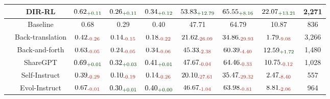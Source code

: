 \begin{table}[pos=tbp]
{\begin{tabular}{c|c|ccc|cc|cc}
& \textbf{DIR-RL} & \textbf{$\text{0.62}_{\textcolor{deepgreen}{\text{+0.11}}}$} & \textbf{$\text{0.26}_{\textcolor{deepgreen}{\text{+0.11}}}$} & \textbf{$\text{0.34}_{\textcolor{deepgreen}{\text{+0.12}}}$} & \textbf{$\text{53.83}_{\textcolor{deepgreen}{\text{+12.79}}}$} & \textbf{$\text{65.55}_{\textcolor{deepgreen}{\text{+8.16}}}$} & \textbf{$\text{22.07}_{\textcolor{deepgreen}{\text{+13.21}}}$} & 2,271 \\
\midrule
{} 
& Baseline & 0.68 & 0.29 & 0.40 & 47.71 & 64.79 & 10.87 & 836 \\
& Back-translation & $\text{0.42}_{\textcolor{deepred}{\text{-0.26}}}$ & $\text{0.14}_{\textcolor{deepred}{\text{-0.15}}}$ & $\text{0.18}_{\textcolor{deepred}{\text{-0.22}}}$ & $\text{21.62}_{\textcolor{deepred}{\text{-26.09}}}$ & $\text{34.86}_{\textcolor{deepred}{\text{-29.93}}}$ & $\text{1.79}_{\textcolor{deepred}{\text{-9.08}}}$ & 3,266 \\
& Back-and-forth & $\text{0.63}_{\textcolor{deepred}{\text{-0.05}}}$ & $\text{0.24}_{\textcolor{deepred}{\text{-0.05}}}$ & $\text{0.34}_{\textcolor{deepred}{\text{-0.06}}}$ & $\text{45.33}_{\textcolor{deepred}{\text{-2.38}}}$ & $\text{60.39}_{\textcolor{deepred}{\text{-4.40}}}$ & $\text{12.59}_{\textcolor{deepgreen}{\text{+1.72}}}$ & 1,480 \\
& ShareGPT & $\text{0.69}_{\textcolor{deepgreen}{\text{+0.01}}}$ & $\text{0.32}_{\textcolor{deepgreen}{\text{+0.03}}}$ & $\text{0.41}_{\textcolor{deepgreen}{\text{+0.01}}}$ & $\text{47.67}_{\textcolor{deepred}{\text{-0.04}}}$ & $\text{64.46}_{\textcolor{deepred}{\text{-0.33}}}$ & $\text{10.75}_{\textcolor{deepred}{\text{-0.12}}}$ & 1,028 \\
& Self-Instruct & $\text{0.39}_{\textcolor{deepred}{\text{-0.29}}}$ & $\text{0.10}_{\textcolor{deepred}{\text{-0.19}}}$ & $\text{0.14}_{\textcolor{deepred}{\text{-0.26}}}$ & $\text{20.10}_{\textcolor{deepred}{\text{-27.61}}}$ & $\text{35.47}_{\textcolor{deepred}{\text{-29.32}}}$ & $\text{2.47}_{\textcolor{deepred}{\text{-8.40}}}$ & 557 \\
& Evol-Instruct & $\text{0.67}_{\textcolor{deepred}{\text{-0.01}}}$ & $\text{0.30}_{\textcolor{deepgreen}{\text{+0.01}}}$ & $\text{0.40}_{\textcolor{deepgreen}{\text{+0.00}}}$ & $\text{46.67}_{\textcolor{deepred}{\text{-1.04}}}$ & $\text{63.98}_{\textcolor{deepred}{\text{-0.81}}}$ & $\text{8.81}_{\textcolor{deepred}{\text{-2.06}}}$ & 964 \\

\end{tabular}}
\end{table}
